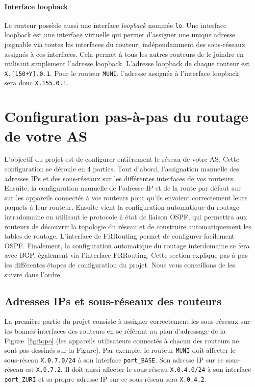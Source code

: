 \documentclass[a4paper, 11pt]{article}
\begin{document}
\paragraph*{Interface loopback}
Le routeur possède aussi
une interface \textit{loopback} nommée \texttt{lo}. Une interface loopback
est une interface virtuelle qui permet d'assigner une unique adresse
joignable via toutes les interfaces du routeur, indépendamment des
sous-réseaux assignés à ces interfaces. Cela permet à tous les autres
routeurs de le joindre en utilisant simplement l'adresse loopback.
L'adresse loopback de chaque routeur est \texttt{X.[150+Y].0.1}.
Pour le routeur \texttt{MUNI}, l'adresse assignée à l'interface
loopback sera donc \texttt{X.155.0.1}.


\section{Configuration pas-à-pas du routage de votre AS}


L'objectif du projet est de configurer entièrement le réseau de votre AS.
Cette configuration se déroule en 4 parties. Tout d'abord, l'assignation
manuelle des adresses IPs et des sous-réseaux sur les différentes interfaces
de vos routeurs. Ensuite, la configuration manuelle de l'adresse IP et de la
route par défaut sur sur les appareils connectés à vos routeurs pour qu'ils
envoient correctement leurs paquets à leur routeur.
Ensuite vient la configuration automatique du routage intradomaine
en utilisant le protocole à état de liaison OSPF, qui permettra aux routeurs
de découvrir la topologie du réseau et de construire automatiquement
les tables de routage. L'interface de FRRouting permet de configurer
facilement OSPF. Finalement, la configuration automatique du routage
interdomaine se fera avec BGP, également via l'interface FRRouting.
Cette section explique pas-à-pas les différentes étapes de configuration
du projet. Nous vous conseillons de les suivre dans l'ordre.

\subsection{Adresses IPs et sous-réseaux des routeurs}

La première partie du projet consiste à assigner correctement les
sous-réseaux sur les bonnes interfaces des routeurs en se référant au
plan d'adressage de la Figure~\ref{fig:topo} (les appareils utilisateurs
connectés à chacun des routeurs ne sont pas dessinés sur la Figure).
Par exemple, le routeur \texttt{MUNI} doit affecter le sous-réseau
\texttt{X.0.7.0/24} à son interface \texttt{port\_BASE}. Son adresse
IP sur ce sous-réseau est \texttt{X.0.7.2}. Il doit aussi affecter le
sous-réseau \texttt{X.0.4.0/24} à son interface \texttt{port\_ZURI} et
sa propre adresse IP sur ce sous-réseau sera \texttt{X.0.4.2}.
\end{document}
